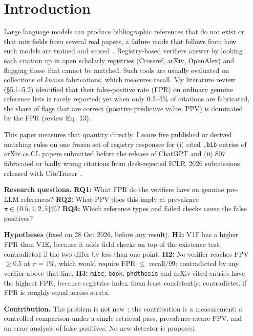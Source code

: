 \documentclass[conference]{IEEEtran}
\begin{document}
\section{Introduction}
Large language models can produce bibliographic references that do not exist or that mix
fields from several real papers, a failure mode that follows from how such models are trained and
scored~\cite{kalai2025}. Registry-based verifiers answer by looking each citation up in
open scholarly registries (Crossref, arXiv, OpenAlex) and flagging those that cannot be matched.
Such tools are usually evaluated on collections of \emph{known} fabrications, which measures
recall. My literature review~\cite{karthik2026review} (\S5.1--5.2) identified that their
false-positive rate (FPR) on ordinary genuine reference lists is rarely reported; yet when only
0.5--5\% of citations are fabricated, the share of flags that are correct (positive predictive
value, PPV) is dominated by the FPR (review Eq.~13).

This paper measures that quantity directly. I score five published or derived matching rules on
one frozen set of registry responses for (i) cited \texttt{.bib} entries of arXiv cs.CL papers
submitted before the release of ChatGPT and (ii) 807 fabricated or badly wrong citations from
desk-rejected ICLR~2026 submissions released with CiteTracer~\cite{li2026citetracer,citetracerrepo}.

\textbf{Research questions.}
\textbf{RQ1:} What FPR do the verifiers have on genuine pre-LLM references?
\textbf{RQ2:} What PPV does this imply at prevalence $\pi \in \{0.5,1,2,5\}\%$?
\textbf{RQ3:} Which reference types and failed checks cause the false positives?

\textbf{Hypotheses} (fixed on 28 Oct 2026, before any result).
\textbf{H1:} V1F has a higher FPR than V1E, because it adds field checks on top of the existence test;
contradicted if the two differ by less than one point.
\textbf{H2:} No verifier reaches PPV $\ge 0.5$ at $\pi=1\%$, which would require FPR $\le$ recall$/99$;
contradicted by any verifier above that line.
\textbf{H3:} \texttt{misc}, \texttt{book}, \texttt{phdthesis} and arXiv-cited entries have the highest
FPR, because registries index them least consistently; contradicted if FPR is roughly equal across strata.

\textbf{Contribution.} The problem is not new~\cite{badalova2026,neralla2026}; the contribution is
a measurement: a controlled comparison under a single retrieval pass, prevalence-aware PPV, and
an error analysis of false positives. No new detector is proposed.
\end{document}
